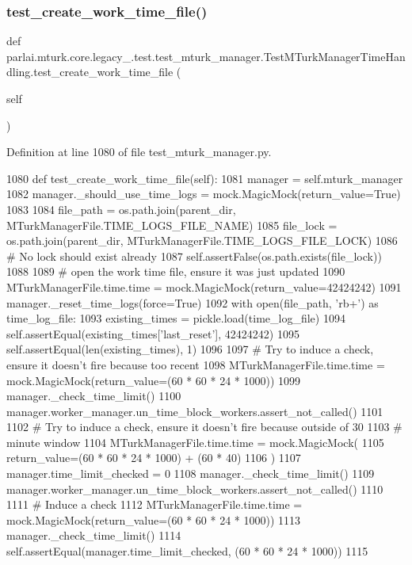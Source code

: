 \subsubsection{\texorpdfstring{test\+\_\+create\+\_\+work\+\_\+time\+\_\+file()}{test\_create\_work\_time\_file()}}
{\footnotesize\ttfamily def parlai.\+mturk.\+core.\+legacy\+\_.\+test.\+test\+\_\+mturk\+\_\+manager.\+Test\+M\+Turk\+Manager\+Time\+Handling.\+test\+\_\+create\+\_\+work\+\_\+time\+\_\+file (\begin{DoxyParamCaption}\item[{}]{self }\end{DoxyParamCaption})}



Definition at line 1080 of file test\+\_\+mturk\+\_\+manager.\+py.


\begin{DoxyCode}
1080     \textcolor{keyword}{def }test\_create\_work\_time\_file(self):
1081         manager = self.mturk\_manager
1082         manager.\_should\_use\_time\_logs = mock.MagicMock(return\_value=\textcolor{keyword}{True})
1083 
1084         file\_path = os.path.join(parent\_dir, MTurkManagerFile.TIME\_LOGS\_FILE\_NAME)
1085         file\_lock = os.path.join(parent\_dir, MTurkManagerFile.TIME\_LOGS\_FILE\_LOCK)
1086         \textcolor{comment}{# No lock should exist already}
1087         self.assertFalse(os.path.exists(file\_lock))
1088 
1089         \textcolor{comment}{# open the work time file, ensure it was just updated}
1090         MTurkManagerFile.time.time = mock.MagicMock(return\_value=42424242)
1091         manager.\_reset\_time\_logs(force=\textcolor{keyword}{True})
1092         with open(file\_path, \textcolor{stringliteral}{'rb+'}) \textcolor{keyword}{as} time\_log\_file:
1093             existing\_times = pickle.load(time\_log\_file)
1094             self.assertEqual(existing\_times[\textcolor{stringliteral}{'last\_reset'}], 42424242)
1095             self.assertEqual(len(existing\_times), 1)
1096 
1097         \textcolor{comment}{# Try to induce a check, ensure it doesn't fire because too recent}
1098         MTurkManagerFile.time.time = mock.MagicMock(return\_value=(60 * 60 * 24 * 1000))
1099         manager.\_check\_time\_limit()
1100         manager.worker\_manager.un\_time\_block\_workers.assert\_not\_called()
1101 
1102         \textcolor{comment}{# Try to induce a check, ensure it doesn't fire because outside of 30}
1103         \textcolor{comment}{# minute window}
1104         MTurkManagerFile.time.time = mock.MagicMock(
1105             return\_value=(60 * 60 * 24 * 1000) + (60 * 40)
1106         )
1107         manager.time\_limit\_checked = 0
1108         manager.\_check\_time\_limit()
1109         manager.worker\_manager.un\_time\_block\_workers.assert\_not\_called()
1110 
1111         \textcolor{comment}{# Induce a check}
1112         MTurkManagerFile.time.time = mock.MagicMock(return\_value=(60 * 60 * 24 * 1000))
1113         manager.\_check\_time\_limit()
1114         self.assertEqual(manager.time\_limit\_checked, (60 * 60 * 24 * 1000))
1115 
\end{DoxyCode}


